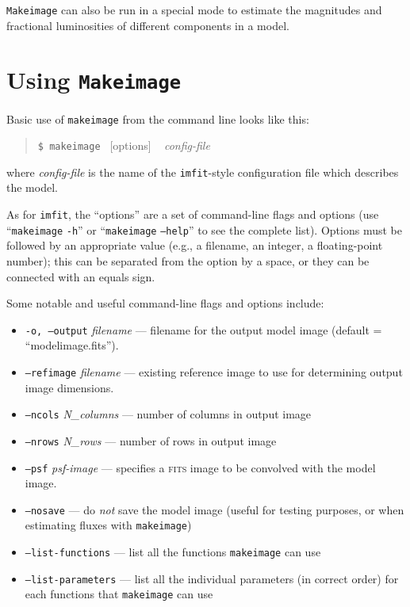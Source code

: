 \documentclass[10pt,a4paper,article]{memoir}
\newcommand{\imfit}{\texttt{imfit}}
\newcommand{\makeimage}{\texttt{makeimage}}
\newcommand{\Makeimage}{\texttt{Makeimage}}
\begin{document}
\Makeimage{} can also be run in a special mode to estimate the
magnitudes and fractional luminosities of different components in a
model.


\section{Using \Makeimage{}}

Basic use of \makeimage{} from the command line looks like this:
\begin{quote}
  \texttt{\$ \makeimage{} }  [options] ~ \textit{config-file}
\end{quote}
where \textit{config-file} is the name of the \imfit{}-style configuration file
which describes the model.

As for \imfit, the ``options'' are a set of command-line flags and
options (use ``\makeimage{} \texttt{-h}'' or ``\makeimage{} \texttt{--help}'' to
see the complete list). Options must be followed by an appropriate value
(e.g., a filename, an integer, a floating-point number); this can be
separated from the option by a space, or they can be connected with an
equals sign.

\bigskip

Some notable and useful command-line flags and options include:
\begin{itemize}
\item \texttt{-o, --output} \textit{filename} --- filename for the output model
image (default = ``modelimage.fits'').

\item \texttt{--refimage} \textit{filename} --- existing reference image to
use for determining output image dimensions.

\item \texttt{--ncols} \textit{N\_columns} --- number of columns in output image

\item \texttt{--nrows} \textit{N\_rows} --- number of rows in output image

\bigskip

\item \texttt{--psf} \textit{psf-image} --- specifies a \textsc{fits} image to be convolved
with the model image.

\bigskip


\item \texttt{--nosave} --- do \textit{not} save the model image (useful for testing
purposes, or when estimating fluxes with \makeimage)

\bigskip

\item \texttt{--list-functions} --- list all the functions \makeimage{}
can use

\item \texttt{--list-parameters} --- list all the individual parameters (in correct order)
for each functions that \makeimage{} can use


\end{itemize}
\end{document}

